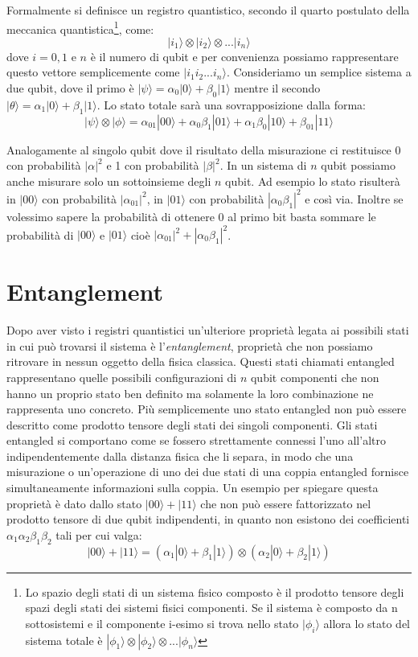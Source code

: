 Formalmente si definisce un registro quantistico, secondo il quarto postulato della meccanica quantistica\footnote{Lo spazio degli stati di un sistema fisico composto è il prodotto tensore degli spazi degli stati dei sistemi fisici componenti. Se il sistema è composto da n sottosistemi e il componente i-esimo si trova nello stato \( | \phi _i \rangle \) allora lo stato del sistema totale è \( | \phi _1 \rangle \otimes | \phi _2 \rangle \otimes ... | \phi _n \rangle \)}, come:
\[
  | i _1 \rangle \otimes | i _2 \rangle \otimes ... | i _n \rangle
\]
dove \(i = 0,1\) e \(n\) è il numero di qubit e per convenienza possiamo rappresentare questo vettore semplicemente come \( | i _1 i _2 ... i _n \rangle \). Consideriamo un semplice sistema a due qubit, dove il primo è \( |\psi \rangle  = \alpha _0 |0 \rangle  + \beta _0 |1 \rangle \)  mentre il secondo \( |\theta \rangle  = \alpha _1 | 0 \rangle  + \beta _1 | 1 \rangle \). Lo stato totale sarà una sovrapposizione dalla forma:
\[
  | \psi \rangle \otimes | \phi \rangle 
  = \alpha _{01} | 00 \rangle 
  + \alpha _0 \beta _1 | 01 \rangle 
  + \alpha _1 \beta _0 | 10 \rangle 
  +  \beta _{01} | 11 \rangle  
\]

Analogamente al singolo qubit dove il risultato della misurazione ci restituisce 0 con probabilità \( |\alpha|^2 \) e 1 con probabilità \( |\beta|^2 \). In un sistema di \(n\) qubit possiamo anche misurare solo un sottoinsieme degli \(n\) qubit. Ad esempio lo stato risulterà in \(| 00 \rangle \) con probabilità \( | \alpha _{01}|^2 \), in \(| 01 \rangle \) con probabilità \( | \alpha _0 \beta _1|^2 \) e così via. Inoltre se volessimo sapere la probabilità di ottenere 0 al primo bit basta sommare le probabilità di \(| 00 \rangle \) e \(| 01 \rangle \) cioè \( |\alpha _{01}|^2 + |\alpha _0 \beta _1|^2 \).

\section{Entanglement}
Dopo aver visto i registri quantistici un'ulteriore proprietà legata ai possibili stati in cui può trovarsi il sistema è l'\textit{entanglement}, proprietà che non possiamo ritrovare in nessun oggetto della fisica classica. Questi stati chiamati entangled rappresentano quelle possibili configurazioni di \(n\) qubit componenti che non hanno un proprio stato ben definito ma solamente la loro combinazione ne rappresenta uno concreto. Più semplicemente uno stato entangled non può essere descritto come prodotto tensore degli stati dei singoli componenti.
Gli stati entangled si comportano come se fossero strettamente connessi l'uno all'altro indipendentemente dalla distanza fisica che li separa, in modo che una misurazione o un'operazione di uno dei due stati di una coppia entangled fornisce simultaneamente informazioni sulla coppia.
Un esempio per spiegare questa proprietà è dato dallo stato \( | 00 \rangle + | 11 \rangle \) che non può essere fattorizzato nel prodotto tensore di due qubit indipendenti, in quanto non esistono dei coefficienti \( \alpha _1 \alpha _2 \beta _1 \beta _2 \) tali per cui valga:
\[
  | 00 \rangle + | 11 \rangle
  = ( \alpha _1 | 0 \rangle + \beta _1 | 1 \rangle) \otimes ( \alpha _2 | 0 \rangle + \beta _2 | 1 \rangle)  
\]

